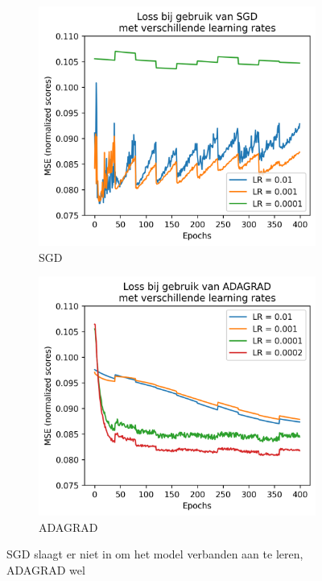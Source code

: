 \begin{figure}[H]
    \begin{subfigure}{.45\textwidth}
        \centering
        \includegraphics[width=1\linewidth]{fig/chapt5/predictor/sgd_slecht.png}
        \caption{SGD}
        \label{fig:chapt5_sgd_slecht_loss}
    \end{subfigure}
    \begin{subfigure}{.45\textwidth}
        \centering
        \includegraphics[width=1\linewidth]{fig/chapt5/predictor/adagrad_goed.png}
        \caption{ADAGRAD}
        \label{fig:chapt5_adagrad_goed}
    \end{subfigure}
    \caption{SGD slaagt er niet in om het model verbanden aan te leren, ADAGRAD wel}
    \label{fig:chapt5_sgd_adagrad_combined}
\end{figure}

